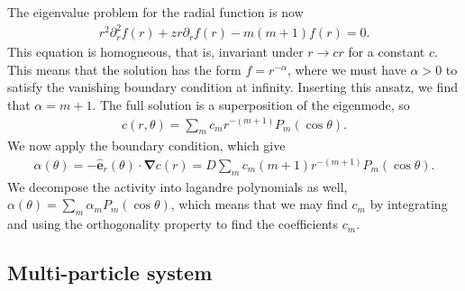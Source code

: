 The eigenvalue problem for the radial function is now
\begin{align}
    r^2\partial_r^2 f(r) + z r \partial_r  f(r)  -m(m+1) f(r) = 0.
\end{align}
%
This equation is homogneous, that is, invariant under $r\rightarrow c r$ for a constant $c$. 
This means that the solution has the form $f = r^{-\alpha}$, where we must have $\alpha>0$ to satisfy the vanishing boundary condition at infinity.
Inserting this ansatz, we find that $\alpha = m + 1$.
The full solution is a superposition of the eigenmode, so
%
\begin{align}
    c(r, \theta) = \sum_m c_m r^{-(m + 1)} P_m(\cos\theta).
\end{align}
%
We now apply the boundary condition, which give
\begin{align}
    \alpha(\theta) 
    = - \hat {\bm e}_r(\theta) \cdot \bm \nabla c(r)
    = D \sum_m c_m (m + 1) r^{-(m + 1)} P_m(\cos\theta).
\end{align}
%
We decompose the activity into lagandre polynomials as well, $\alpha(\theta) = \sum_m \alpha_m P_m(\cos\theta)$, which means that we may find $c_m$ by integrating and using the orthogonality property to find the coefficients $c_m$.



\subsection*{Multi-particle system}

